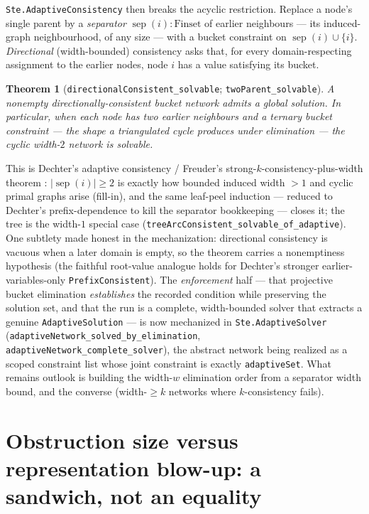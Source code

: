 \documentclass[11pt]{article}
\newtheorem{theorem}{Theorem}
\newcommand{\lean}[1]{\texttt{#1}}
\begin{document}
\lean{Ste.AdaptiveConsistency} then breaks the acyclic restriction.
Replace a node's single parent by a \emph{separator} $\operatorname{sep}(i)
: \mathrm{Finset}$ of earlier neighbours --- its induced-graph
neighbourhood, of any size --- with a bucket constraint on
$\operatorname{sep}(i) \cup \{i\}$.  \emph{Directional} (width-bounded)
consistency asks that, for every domain-respecting assignment to the
earlier nodes, node $i$ has a value satisfying its bucket.

\begin{theorem}[\lean{directionalConsistent\_solvable};
\lean{twoParent\_solvable}]
A nonempty directionally-consistent bucket network admits a global
solution.  In particular, when each node has \emph{two} earlier
neighbours and a ternary bucket constraint --- the shape a triangulated
cycle produces under elimination --- the cyclic width-$2$ network is
solvable.
\end{theorem}

\noindent This is Dechter's adaptive consistency / Freuder's
strong-$k$-consistency-plus-width theorem
\citep{freuder1982backtrack,dechter2003constraint}: $|\operatorname{sep}(i)|
\ge 2$ is exactly how bounded induced width $> 1$ and cyclic primal
graphs arise (fill-in), and the same leaf-peel induction --- reduced to
Dechter's prefix-dependence to kill the separator bookkeeping --- closes
it; the tree is the width-$1$ special case
(\lean{treeArcConsistent\_solvable\_of\_adaptive}).  One subtlety made
honest in the mechanization: directional consistency is vacuous when a
later domain is empty, so the theorem carries a nonemptiness hypothesis
(the faithful root-value analogue holds for Dechter's stronger
earlier-variables-only \lean{PrefixConsistent}).  The \emph{enforcement}
half --- that projective bucket elimination \emph{establishes} the
recorded condition while preserving the solution set, and that the run
is a complete, width-bounded solver that extracts a genuine
\lean{AdaptiveSolution} --- is now mechanized in \lean{Ste.AdaptiveSolver}
(\lean{adaptiveNetwork\_solved\_by\_elimination},
\lean{adaptiveNetwork\_complete\_solver}), the abstract network being
realized as a scoped constraint list whose joint constraint is exactly
\lean{adaptiveSet}.  What remains outlook is building the width-$w$
elimination order from a separator width bound, and the converse
(width-$\ge k$ networks where $k$-consistency fails).

\section{Obstruction size versus representation blow-up: a sandwich, not an equality}
\label{sec:repbounds}
\end{document}
